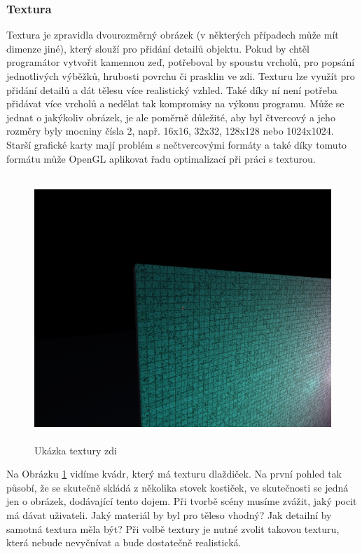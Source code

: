 \documentclass[12pt]{article}
\begin{document}
\subsubsection{Textura}

Textura je zpravidla dvourozměrný obrázek (v některých případech může mít dimenze jiné), který slouží pro přidání detailů objektu. Pokud by chtěl programátor vytvořit kamennou zeď, potřeboval by spoustu vrcholů, pro popsání jednotlivých výběžků, hrubosti povrchu či prasklin ve zdi. Texturu lze využít pro přidání detailů a dát tělesu více realistický vzhled. Také díky ní není potřeba přidávat více vrcholů a nedělat tak kompromisy na výkonu programu. Může se jednat o jakýkoliv obrázek, je ale poměrně důležité, aby byl čtvercový a jeho rozměry byly mocniny čísla 2, např. 16x16, 32x32, 128x128 nebo 1024x1024. Starší grafické karty mají problém s nečtvercovými formáty a také díky tomuto formátu může OpenGL aplikovat řadu optimalizací při práci s texturou. \cite{texture}

\vspace{0.5cm}
\begin{figure}[h]
    \centering
    \includegraphics[height=10cm]{texture_example.png}
    \caption{Ukázka textury zdi}
    \label{fig:Ukázka textury zdi}
\end{figure}

Na Obrázku \ref{fig:Ukázka textury zdi} vidíme kvádr, který má texturu dlaždiček. Na první pohled tak působí, že se skutečně skládá z několika stovek kostiček, ve skutečnosti se jedná jen o obrázek, dodávající tento dojem. Při tvorbě scény musíme zvážit, jaký pocit má dávat uživateli. Jaký materiál by byl pro těleso vhodný? Jak detailní by samotná textura měla být? Při volbě textury je nutné zvolit takovou texturu, která nebude nevyčnívat a bude dostatečně realistická.
\end{document}
